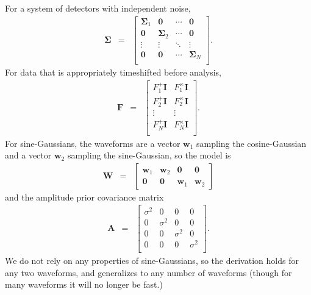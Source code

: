 \documentclass{article}
\begin{document}
For a system of detectors with independent noise,
\begin{eqnarray}
\mathbf{\Sigma}&=&\left[
\begin{array}{cccc}
\mathbf{\Sigma}_1 & \mathbf{0} & \cdots & \mathbf{0} \\
\mathbf{0} & \mathbf{\Sigma}_2 & \cdots & \mathbf{0} \\
\vdots & \vdots & \ddots & \vdots \\
\mathbf{0} & \mathbf{0} & \cdots & \mathbf{\Sigma}_N \\
\end{array}
\right].
\end{eqnarray}
For data that is appropriately timeshifted before analysis,
\begin{eqnarray}
\mathbf{F}&=&\left[
\begin{array}{cc}
F_1^+\mathbf{I} & F_1^\times\mathbf{I} \\
F_2^+\mathbf{I} & F_2^\times\mathbf{I} \\
\vdots & \vdots \\
F_N^+\mathbf{I} & F_N^\times\mathbf{I} \\
\end{array}
\right].
\end{eqnarray}
For sine-Gaussians, the waveforms are a vector $\mathbf{w}_1$ sampling the cosine-Gaussian and a vector $\mathbf{w}_2$ sampling the sine-Gaussian, so the model is
\begin{eqnarray}
\mathbf{W}&=&\left[
\begin{array}{cccc}
\mathbf{w}_1 & \mathbf{w}_2 & \mathbf{0} & \mathbf{0} \\
\mathbf{0} & \mathbf{0} & \mathbf{w}_1 & \mathbf{w}_2
\end{array}
\right]
\end{eqnarray}
and the amplitude prior covariance matrix
\begin{eqnarray}
\mathbf{A}&=&\left[
\begin{array}{cccc}
\sigma^2 & 0 & 0 & 0 \\
0 & \sigma^2 & 0 & 0 \\
0 & 0 & \sigma^2 & 0 \\
0 & 0 & 0 & \sigma^2 \\
\end{array}
\right].
\end{eqnarray}
We do not rely on any properties of sine-Gaussians, so the derivation holds for any two waveforms, and generalizes to any number of waveforms (though for many waveforms it will no longer be fast.)
\end{document}
